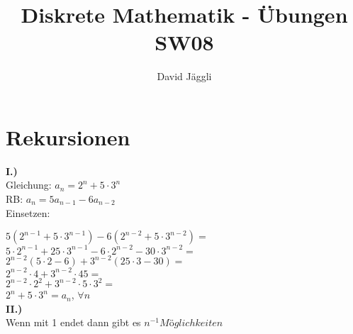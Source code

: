 \documentclass[12pt]{scrartcl}
\author{David Jäggli}
\title{Diskrete Mathematik - Übungen SW08}
\begin{document}
\maketitle

\tableofcontents

\newpage
\section{Rekursionen}
\textbf{I.)}\\
Gleichung: $a_n = 2^n + 5 \cdot 3^n$\\
RB: $a_n = 5a_{n-1} - 6a_{n-2}$\\

Einsetzen:

$5(2^{n-1} + 5 \cdot 3^{n-1}) - 6(2^{n-2} + 5 \cdot 3^{n-2}) = $\\
$5 \cdot 2^{n-1} + 25 \cdot 3^{n-1} - 6 \cdot 2^{n-2} - 30 \cdot 3^{n-2} = $\\
$2^{n-2} (5 \cdot 2 - 6) + 3^{n-2} (25 \cdot 3 - 30) = $\\
$2^{n-2} \cdot 4 + 3^{n-2} \cdot 45 = $\\
$2^{n-2} \cdot 2^2 + 3^{n-2} \cdot 5 \cdot 3^2 = $\\
$2^n + 5 \cdot 3^n = a_n$, $\forall n$\\


\textbf{II.)}\\
Wenn mit 1 endet dann gibt es $n^{-1} Möglichkeiten$






% 
\end{document}
